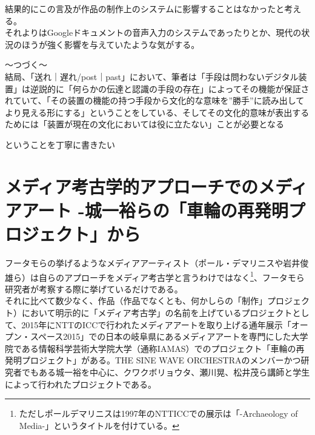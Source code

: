結果的にこの言及が作品の制作上のシステムに影響することはなかったと考える。\\
それよりはGoogleドキュメントの音声入力のシステムであったりとか、現代の状況のほうが強く影響を与えていたような気がする。

〜つづく〜\\
結局、「送れ｜遅れ/post｜past」において、筆者は「手段は問わないデジタル装置」は逆説的に「何らかの伝達と認識の手段の存在」によってその機能が保証されていて、「その装置の機能の持つ手段から文化的な意味を''勝手''に読み出してより見える形にする」ということをしている、そしてその文化的意味が表出するためには「装置が現在の文化においては役に立たない」ことが必要となる

ということを丁寧に書きたい

\section{メディア考古学的アプローチでのメディアアート
-城一裕らの「車輪の再発明プロジェクト」から}\label{ux30e1ux30c7ux30a3ux30a2ux8003ux53e4ux5b66ux7684ux30a2ux30d7ux30edux30fcux30c1ux3067ux306eux30e1ux30c7ux30a3ux30a2ux30a2ux30fcux30c8--ux57ceux4e00ux88d5ux3089ux306eux8ecaux8f2aux306eux518dux767aux660eux30d7ux30edux30b8ux30a7ux30afux30c8ux304bux3089}

フータモらの挙げるようなメディアアーティスト（ポール・デマリニスや岩井俊雄ら）は自らのアプローチをメディア考古学と言うわけではなく\footnote{ただしポールデマリニスは1997年のNTTICCでの展示は「-Archaeology
  of Media-」というタイトルを付けている。}、フータモら研究者が考察する際に挙げているだけである。\\
それに比べて数少なく、作品（作品でなくとも、何かしらの「制作」プロジェクト）において明示的に「メディア考古学」の名前を上げているプロジェクトとして、2015年にNTTのICCで行われたメディアアートを取り上げる通年展示「オープン・スペース2015」での日本の岐阜県にあるメディアアートを専門にした大学院である情報科学芸術大学院大学（通称IAMAS）でのプロジェクト「車輪の再発明プロジェクト」がある。THE
SINE WAVE
ORCHESTRAのメンバーかつ研究者でもある城一裕を中心に、クワクボリョウタ、瀬川晃、松井茂ら講師と学生によって行われたプロジェクトである。

